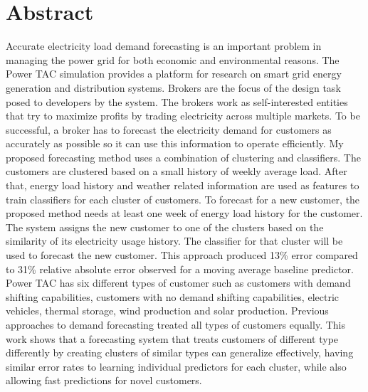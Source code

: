 

\chapter*{Abstract}

Accurate electricity load demand forecasting is an important problem in managing the power grid for both economic and environmental reasons. The Power TAC simulation provides a platform for research on smart grid energy generation and distribution systems. Brokers are the focus of the design task posed to developers by the system. The brokers work as self-interested entities that try to maximize profits by trading electricity across multiple markets. To be successful, a broker has to forecast  the electricity demand for customers as accurately as possible so it can use this information to operate efficiently. My proposed forecasting method uses a combination of clustering and classifiers. The customers are clustered based on a small history of weekly average load. After that, energy load history and weather related information are used as features to train classifiers for each cluster of customers. To forecast for a new customer, the proposed method needs at least one week of energy load history for the customer. The system assigns the  new customer to one of the clusters based on the similarity of its electricity usage history. The classifier for that cluster will be used to forecast the new customer. This approach produced 13\% error compared to 31\% relative absolute error observed for a moving average baseline predictor. Power TAC has six different types of customer such as customers with demand shifting capabilities, customers with no demand shifting capabilities, electric vehicles, thermal storage, wind production and solar production. Previous approaches to demand forecasting treated all types of customers equally. This work shows that a forecasting system that treats customers of different type differently by creating clusters of similar types can generalize effectively, having similar error rates to learning individual predictors for each cluster, while also allowing fast predictions for novel customers.
